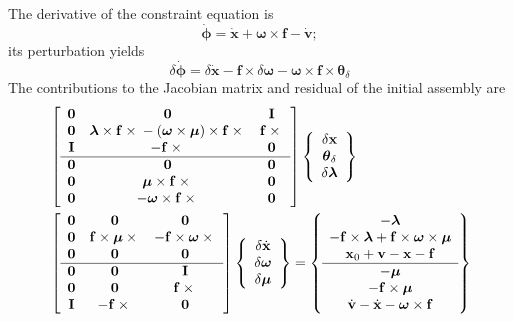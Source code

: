 \documentclass[10pt,dvips,fleqn,subeqn]{report}
\newcommand{\T}[1]{\bm{\mathbf{#1}}}
\begin{document}
The derivative of the constraint equation is
\begin{equation}
	\dot{\T{\phi}}
	= \dot{\T{x}}
	+ \T{\omega}\times\T{f}
	- \dot{\T{v}} ;
\end{equation}
its perturbation yields
\begin{equation}
	\delta\dot{\T{\phi}}
	= \delta\dot{\T{x}}
	- \T{f}\times\delta\T{\omega}
	- \T{\omega}\times\T{f}\times\T{\theta}_{\delta}
\end{equation}
The contributions to the Jacobian matrix and residual 
of the initial assembly are
\begin{align}
	& \sqbr{\matr{ccc}{
		\T{0} & \T{0} & \T{I} \\				%
		\T{0} & \T{\lambda}\times\T{f}\times{}
			- \plbr{\T{\omega}\times\T{\mu}}\times\T{f}\times{} &
			\T{f}\times{} \\				%
		\T{I} & -\T{f}\times{} & \T{0} \\			%
%
	\hline
		\T{0} & \T{0} & \T{0} \\				%
		\T{0} & \T{\mu}\times\T{f}\times{} & \T{0} \\		%
		\T{0} & -\T{\omega}\times\T{f}\times{} & \T{0}		%
	}} \cubr{\cvvect{
		\delta\T{x} \\
		\T{\theta}_{\delta} \\
		\delta\T{\lambda}
	}} \nonumber \\
	& \sqbr{\matr{ccc}{
		\T{0} & \T{0} & \T{0} \\				%
		\T{0} & \T{f}\times\T{\mu}\times{} &
			-\T{f}\times\T{\omega}\times{} \\		%
		\T{0} & \T{0} & \T{0} \\				%
%
	\hline
		\T{0} & \T{0} & \T{I} \\				%
		\T{0} & \T{0} & \T{f}\times{} \\			%
		\T{I} & -\T{f}\times{} & \T{0} 				%
	}} \cubr{\cvvect{
		\delta\dot{\T{x}} \\
		\delta\T{\omega} \\
		\delta\T{\mu}
	}} %
	= \cubr{\cvvect{
		- \T{\lambda} \\
		- \T{f}\times\T{\lambda}
			+ \T{f}\times\T{\omega}\times\T{\mu} \\
		\T{x}_0 + \T{v} - \T{x} - \T{f} \\
%
	\hline
		- \T{\mu} \\
		- \T{f}\times\T{\mu} \\
		\dot{\T{v}} - \dot{\T{x}} - \T{\omega}\times\T{f}
	}}
\end{align}
\end{document}
